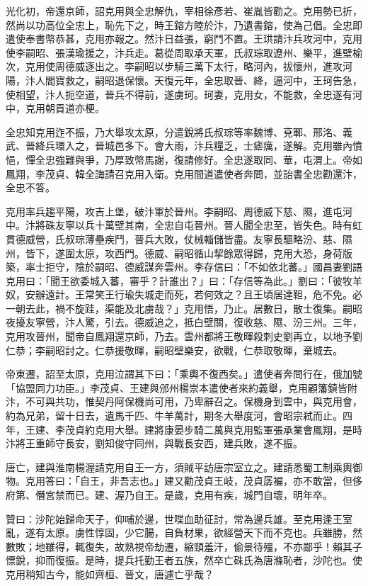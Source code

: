 \begin{pinyinscope}
 光化初，帝還京師，詔克用與全忠解仇，宰相徐彥若、崔胤皆勸之。克用勢已折，然尚以功高位全忠上，恥先下之，時王鎔方睦於汴，乃遺書鎔，使為己倡。全忠即遣使奉書幣恭甚，克用亦報之。然汴日益張，窮鬥不置。王珙請汴兵攻河中，克用使李嗣昭、張漢瑜援之，汴兵走。葛從周取承天軍，氏叔琮取遼州、樂平，進壁榆次，克用使周德威逐出之。李嗣昭以步騎三萬下太行，略河內，拔懷州，進攻河陽，汴人閻寶救之，嗣昭退保懷。天復元年，全忠取晉、絳，逼河中，王珂告急，使相望，汴人扼空道，晉兵不得前，遂虜珂。珂妻，克用女，不能救，全忠遂有河中，克用朝貢道亦梗。



 全忠知克用迮不振，乃大舉攻太原，分遣銳將氏叔琮等率魏博、兗鄆、邢洺、義武、晉絳兵環入之，晉城邑多下。會大雨，汴兵糧乏，士瘧癘，遂解。克用雖內憤悒，憚全忠強難與爭，乃厚致幣馬謝，復請修好。全忠遂取同、華，屯渭上。帝如鳳翔，李茂貞、韓全誨請召克用入衛。克用間道遣使者奔問，並詒書全忠勸還汴，全忠不答。



 克用率兵趨平陽，攻吉上堡，破汴軍於晉州。李嗣昭、周德威下慈、隰，進屯河中。汴將硃友寧以兵十萬壁其南，全忠自屯晉州。晉人聞全忠至，皆失色。時有虹貫德威營，氏叔琮薄壘疾鬥，晉兵大敗，仗械輜儲皆盡。友寧長驅略汾、慈、隰州，皆下，遂圍太原，攻西門。德威、嗣昭循山挈餘眾得歸，克用大恐，身荷版築，率士拒守，陰於嗣昭、德威謀奔雲州。李存信曰：「不如依北蕃。」國昌妻劉語克用曰：「聞王欲委城入蕃，審乎？計誰出？」曰：「存信等為此。」劉曰：「彼牧羊奴，安辦遠計。王常笑王行瑜失城走而死，若何效之？且王頃居達靼，危不免。必一朝去此，禍不旋跬，渠能及北虜哉？」克用悟，乃止。居數日，散士復集。嗣昭夜擾友寧營，汴人驚，引去。德威追之，抵白壁關，復收慈、隰、汾三州。三年，克用攻晉州，聞帝自鳳翔還京師，乃去。雲州都將王敬暉殺刺史劉再立，以地予劉仁恭；李嗣昭討之。仁恭援敬暉，嗣昭壁樂安，欲戰，仁恭取敬暉，棄城去。



 帝東遷，詔至太原，克用泣謂其下曰：「乘輿不復西矣。」遣使者奔問行在，俄加號「協盟同力功臣。」李茂貞、王建與邠州楊崇本遣使者來約義舉，克用顧籓鎮皆附汴，不可與共功，惟契丹阿保機尚可用，乃卑辭召之。保機身到雲中，與克用會，約為兄弟，留十日去，遺馬千匹、牛羊萬計，期冬大舉度河，會昭宗弒而止。四年，王建、李茂貞約克用大舉。建將康晏步騎二萬與克用監軍張承業會鳳翔，是時汴將王重師守長安，劉知俊守同州，與戰長安西，建兵敗，遂不振。



 唐亡，建與淮南楊渥請克用自王一方，須賊平訪唐宗室立之。建請悉蜀工制乘輿御物。克用答曰：「自王，非吾志也。」建又勸茂貞王岐，茂貞孱褊，亦不敢當，但侈府第、僭宮禁而已。建、渥乃自王。是歲，克用有疾，城門自壞，明年卒。



 贊曰：沙陀始歸命天子，仰哺於邊，世喋血助征討，常為邊兵雄。至克用逢王室亂，遂有太原。虜性惇固，少它腸，自負材果，欲經營天下而不克也。兵雖勝，然數敗；地雖得，輒復失，故熟視帝劫遷，縮頸羞汗，偷景待殭，不亦鄙乎！賴其子慓銳，抑而復振。是時，提兵托勤王者五族，然卒亡硃氏為唐滌恥者，沙陀也。使克用稍知古今，能如齊桓、晉文，唐遽亡乎哉？



\end{pinyinscope}
